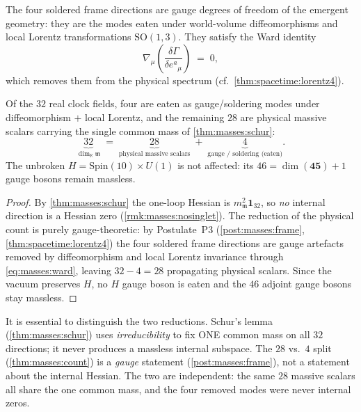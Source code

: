 \begin{postulate}\label{post:masses:frame}
The four soldered frame directions are gauge degrees of freedom of the emergent
geometry: they are the modes eaten under world-volume diffeomorphisms and local
Lorentz transformations $\mathrm{SO}(1,3)$. They satisfy the Ward identity
\begin{equation}\label{eq:masses:ward}
  \nabla_{\mu}\!\left(\frac{\delta\Gamma}{\delta e^{a}{}_{\mu}}\right) \;=\; 0,
\end{equation}
which removes them from the physical spectrum (cf.\ \autoref{thm:spacetime:lorentz4}).
\end{postulate}

\begin{theorem}\label{thm:masses:count}
Of the $32$ real clock fields, four are eaten as gauge/soldering modes under
diffeomorphism $+$ local Lorentz, and the remaining $28$ are physical massive
scalars carrying the single common mass of \autoref{thm:masses:schur}:
\begin{equation}\label{eq:masses:count}
  \underbrace{32}_{\dim_{\mathbb R}\mathfrak m}
  \;=\;
  \underbrace{28}_{\text{physical massive scalars}}
  \;+\;
  \underbrace{4}_{\text{gauge / soldering (eaten)}} .
\end{equation}
The unbroken $H=\mathrm{Spin}(10)\times U(1)$ is not affected: its
$46=\dim(\mathbf{45})+1$ gauge bosons remain massless.
\end{theorem}

\begin{proof}
By \autoref{thm:masses:schur} the one-loop Hessian is $m_{\mathfrak m}^{2}
\mathbf 1_{32}$, so \emph{no} internal direction is a Hessian zero
(\autoref{rmk:masses:nosinglet}). The reduction of the physical count is purely
gauge-theoretic: by Postulate~P3 (\autoref{post:masses:frame},
\autoref{thm:spacetime:lorentz4}) the four soldered frame directions are gauge artefacts
removed by diffeomorphism and local Lorentz invariance through
\eqref{eq:masses:ward}, leaving $32-4=28$ propagating physical scalars. Since
the vacuum preserves $H$, no $H$ gauge boson is eaten and the $46$ adjoint
gauge bosons stay massless.
\end{proof}

\begin{remark}\label{rmk:masses:separation}
It is essential to distinguish the two reductions. Schur's lemma
(\autoref{thm:masses:schur}) uses \emph{irreducibility} to fix ONE common mass
on all $32$ directions; it never produces a massless internal subspace. The
$28$ vs.\ $4$ split (\autoref{thm:masses:count}) is a \emph{gauge} statement
(\autoref{post:masses:frame}), not a statement about the internal Hessian. The
two are independent: the same $28$ massive scalars all share the one common
mass, and the four removed modes were never internal zeros.
\end{remark}

